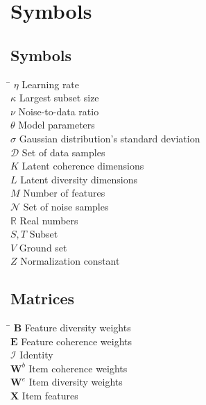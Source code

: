 \chapter*{Symbols}
\label{sec:symbols}


\section*{Symbols}

\begin{tabbing}
 \hspace*{1.6cm} \= \kill
 $\eta$ \> Learning rate \\ [0.5ex]
 $\kappa$ \> Largest subset size \\ [0.5ex]
 $\nu$ \> Noise-to-data ratio \\ [0.5ex]
 $\theta$ \> Model parameters \\ [0.5ex]
 $\sigma$ \> Gaussian distribution's standard deviation \\ [0.5ex]
 $\mathcal{D}$ \> Set of data samples \\ [0.5ex]
 $K$ \> Latent coherence dimensions \\ [0.5ex]
 $L$ \> Latent diversity dimensions \\ [0.5ex]
 $M$ \> Number of features \\ [0.5ex]
 $\mathcal{N}$ \> Set of noise samples \\ [0.5ex]
 $\mathbb{R}$ \> Real numbers \\ [0.5ex]
 $S,T$ \> Subset \\ [0.5ex]
 $V$ \> Ground set \\ [0.5ex]
 $Z$ \> Normalization constant \\ [0.5ex]
\end{tabbing}

\section*{Matrices}

\begin{tabbing}
  \hspace*{1.6cm} \= \kill
  $\mathbf{B}$ \> Feature diversity weights \\ [0.5ex]
  $\mathbf{E}$ \> Feature coherence weights \\ [0.5ex]
  $\mathcal{I}$ \> Identity \\ [0.5ex]
  $\mathbf{W}^{b}$ \> Item coherence weights \\ [0.5ex]
  $\mathbf{W}^{e}$ \> Item diversity weights \\ [0.5ex]
  $\mathbf{X}$ \> Item features \\ [0.5ex]
\end{tabbing}


